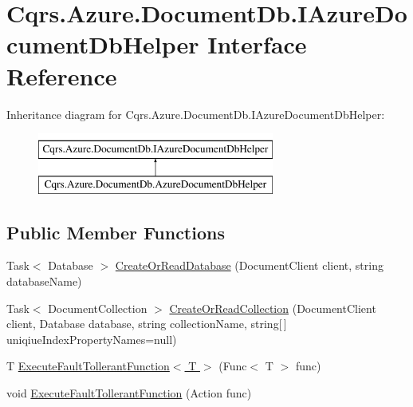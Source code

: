 \hypertarget{interfaceCqrs_1_1Azure_1_1DocumentDb_1_1IAzureDocumentDbHelper}{}\section{Cqrs.\+Azure.\+Document\+Db.\+I\+Azure\+Document\+Db\+Helper Interface Reference}
\label{interfaceCqrs_1_1Azure_1_1DocumentDb_1_1IAzureDocumentDbHelper}
Inheritance diagram for Cqrs.\+Azure.\+Document\+Db.\+I\+Azure\+Document\+Db\+Helper\+:\begin{figure}[H]
\begin{center}
\leavevmode
\includegraphics[height=2.000000cm]{interfaceCqrs_1_1Azure_1_1DocumentDb_1_1IAzureDocumentDbHelper}
\end{center}
\end{figure}
\subsection*{Public Member Functions}
\begin{DoxyCompactItemize}
\item 
Task$<$ Database $>$ \hyperlink{interfaceCqrs_1_1Azure_1_1DocumentDb_1_1IAzureDocumentDbHelper_a07fd454bc3cb598d89d058e0ad0d9bb9_a07fd454bc3cb598d89d058e0ad0d9bb9}{Create\+Or\+Read\+Database} (Document\+Client client, string database\+Name)
\item 
Task$<$ Document\+Collection $>$ \hyperlink{interfaceCqrs_1_1Azure_1_1DocumentDb_1_1IAzureDocumentDbHelper_a9f0e2c54e9a9056351827bdcfd298feb_a9f0e2c54e9a9056351827bdcfd298feb}{Create\+Or\+Read\+Collection} (Document\+Client client, Database database, string collection\+Name, string\mbox{[}$\,$\mbox{]} uniqiue\+Index\+Property\+Names=null)
\item 
T \hyperlink{interfaceCqrs_1_1Azure_1_1DocumentDb_1_1IAzureDocumentDbHelper_a9693547c39af965e6eeeccc65cdd7bea_a9693547c39af965e6eeeccc65cdd7bea}{Execute\+Fault\+Tollerant\+Function$<$ T $>$} (Func$<$ T $>$ func)
\item 
void \hyperlink{interfaceCqrs_1_1Azure_1_1DocumentDb_1_1IAzureDocumentDbHelper_af0a2c96f00154420faa7c528d5bf55bb_af0a2c96f00154420faa7c528d5bf55bb}{Execute\+Fault\+Tollerant\+Function} (Action func)
\end{DoxyCompactItemize}


